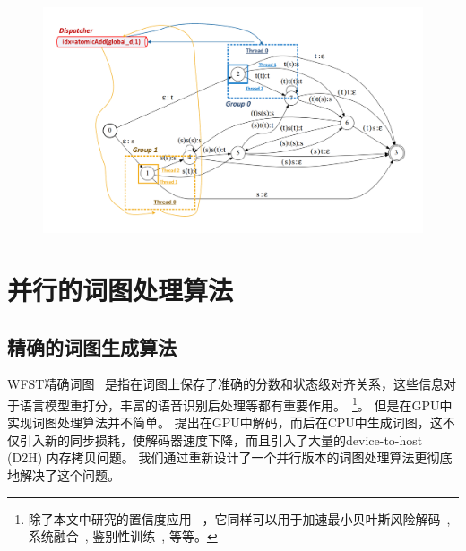 \begin{figure}[!htp]
  \centering
    \captionstyle{\centering}
    \includegraphics[width=1.1\textwidth]{figure/load-balance.pdf}
\end{figure}


\section{并行的词图处理算法}
\label{sec:lat-gen}


\subsection{精确的词图生成算法}
WFST精确词图~\cite{povey2012generating} 是指在词图上保存了准确的分数和状态级对齐关系，这些信息对于语言模型重打分，丰富的语音识别后处理等都有重要作用。~\footnote{除了本文中研究的置信度应用~\cite{mangu1999finding} ，它同样可以用于加速最小贝叶斯风险解码~\cite{goel2000minimum},
系统融合~\cite{fiscus1997post}, 鉴别性训练~\cite{povey2005discriminative}, 等等。 }。 %
但是在GPU中实现词图处理算法并不简单。
\cite{kim2014accelerating} 提出在GPU中解码，而后在CPU中生成词图，这不仅引入新的同步损耗，使解码器速度下降，而且引入了大量的device-to-host (D2H) 内存拷贝问题。
我们通过重新设计了一个并行版本的词图处理算法\cite{povey2012generating}更彻底地解决了这个问题。

